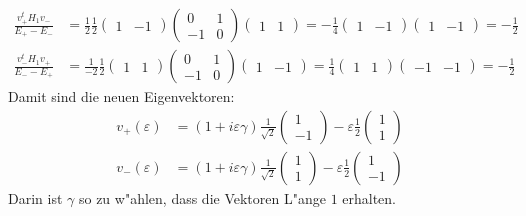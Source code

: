 \begin{align*}
\frac{v_+^tH_1v_-}{E_+-E_-}
&=
\frac{1}{2}
\frac12
	\begin{pmatrix}1&-1\end{pmatrix}
	\begin{pmatrix}0&1\\-1&0\end{pmatrix}
	\begin{pmatrix}1&1\end{pmatrix}
=
-\frac14
	\begin{pmatrix}1&-1\end{pmatrix}
	\begin{pmatrix}1&-1\end{pmatrix}
=
-\frac12
\\
\frac{v_-^tH_1v_+}{E_--E_+}
&=
\frac{1}{-2}
\frac12
	\begin{pmatrix}1&1\end{pmatrix}
	\begin{pmatrix}0&1\\-1&0\end{pmatrix}
	\begin{pmatrix}1&-1\end{pmatrix}
=
\frac14
	\begin{pmatrix}1&1\end{pmatrix}
	\begin{pmatrix}-1&-1\end{pmatrix}
=
-\frac12
\end{align*}
Damit sind die neuen Eigenvektoren:
\begin{align*}
v_+(\varepsilon)
&=
(1+i\varepsilon\gamma)
\frac1{\sqrt{2}}
\begin{pmatrix}1\\-1\end{pmatrix}
-\varepsilon\frac12\begin{pmatrix}1\\1\end{pmatrix}
\\
v_-(\varepsilon)
&=
(1+i\varepsilon\gamma)
\frac1{\sqrt{2}}
\begin{pmatrix}1\\1\end{pmatrix}
-\varepsilon\frac12\begin{pmatrix}1\\-1\end{pmatrix}
\end{align*}
Darin ist $\gamma$ so zu w"ahlen, dass die Vektoren L"ange $1$ erhalten.
